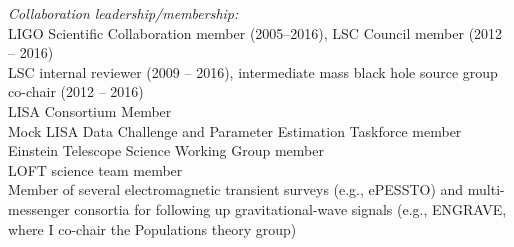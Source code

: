 \documentclass[margin,line]{res}
\begin{document}
\begin{resume}
{\it Collaboration leadership/membership:}\\
LIGO Scientific Collaboration member (2005--2016), LSC Council member (2012 -- 2016)\\
LSC internal reviewer (2009 -- 2016), intermediate mass black hole source group co-chair (2012 -- 2016)\\
LISA Consortium Member\\
Mock LISA Data Challenge and Parameter Estimation Taskforce member\\
Einstein Telescope Science Working Group member\\
LOFT science team member\\
Member of several electromagnetic transient surveys (e.g., ePESSTO) and multi-messenger  consortia for following up gravitational-wave signals (e.g., ENGRAVE, where I co-chair the Populations theory group)\\


\end{resume}
\end{document}
